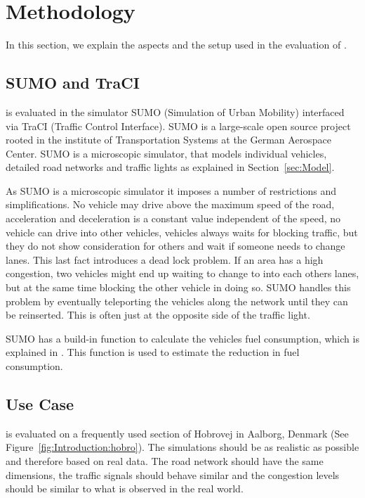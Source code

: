 \section{Methodology}\label{sec:methodology}
In this section, we explain the aspects and the setup used in the evaluation of \tech.

\subsection{SUMO and TraCI}\label{sec:methodology:sumo}
\tech is evaluated in the simulator SUMO (Simulation of Urban Mobility)\cite{sumo} interfaced via TraCI (Traffic Control Interface)\cite{traci}.
SUMO is a large-scale open source project rooted in the institute of Transportation Systems at the German Aerospace Center.
SUMO is a microscopic simulator, that models individual vehicles, detailed road networks and traffic lights as explained in Section~\ref{sec:Model}.

As SUMO is a microscopic simulator it imposes a number of restrictions and simplifications.
No vehicle may drive above the maximum speed of the road, acceleration and deceleration is a constant value independent of the speed, no vehicle can drive into other vehicles, vehicles always waits for blocking traffic, but they do not show consideration for others and wait if someone needs to change lanes.
This last fact introduces a dead lock problem.
If an area has a high congestion, two vehicles might end up waiting to change to into each others lanes, but at the same time blocking the other vehicle in doing so. 
SUMO handles this problem by eventually teleporting the vehicles along the network until they can be reinserted. 
This is often just at the opposite side of the traffic light.

SUMO has a build-in function to calculate the vehicles fuel consumption, which is explained in \cite{SUMOFuel}.
This function is used to estimate the reduction in fuel consumption.

\subsection{Use Case}\label{sec:UseCase}
\tech is evaluated on a frequently used section of Hobrovej in Aalborg, Denmark (See Figure~\ref{fig:Introduction:hobro}).
The simulations should be as realistic as possible and therefore based on real data. 
The road network should have the same dimensions, the traffic signals should behave similar and the congestion levels should be similar to what is observed in the real world.

